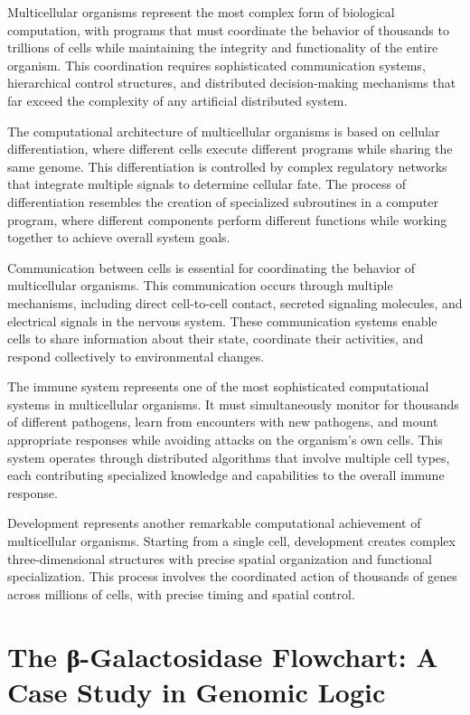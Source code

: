 \documentclass[11pt]{article}
\begin{document}
Multicellular organisms represent the most complex form of biological computation, with programs that must coordinate the behavior of thousands to trillions of cells while maintaining the integrity and functionality of the entire organism. This coordination requires sophisticated communication systems, hierarchical control structures, and distributed decision-making mechanisms that far exceed the complexity of any artificial distributed system.

The computational architecture of multicellular organisms is based on cellular differentiation, where different cells execute different programs while sharing the same genome. This differentiation is controlled by complex regulatory networks that integrate multiple signals to determine cellular fate. The process of differentiation resembles the creation of specialized subroutines in a computer program, where different components perform different functions while working together to achieve overall system goals.

Communication between cells is essential for coordinating the behavior of multicellular organisms. This communication occurs through multiple mechanisms, including direct cell-to-cell contact, secreted signaling molecules, and electrical signals in the nervous system. These communication systems enable cells to share information about their state, coordinate their activities, and respond collectively to environmental changes.

The immune system represents one of the most sophisticated computational systems in multicellular organisms. It must simultaneously monitor for thousands of different pathogens, learn from encounters with new pathogens, and mount appropriate responses while avoiding attacks on the organism's own cells. This system operates through distributed algorithms that involve multiple cell types, each contributing specialized knowledge and capabilities to the overall immune response.

Development represents another remarkable computational achievement of multicellular organisms. Starting from a single cell, development creates complex three-dimensional structures with precise spatial organization and functional specialization. This process involves the coordinated action of thousands of genes across millions of cells, with precise timing and spatial control.

\section{The β-Galactosidase Flowchart: A Case Study in Genomic Logic}
\end{document}
